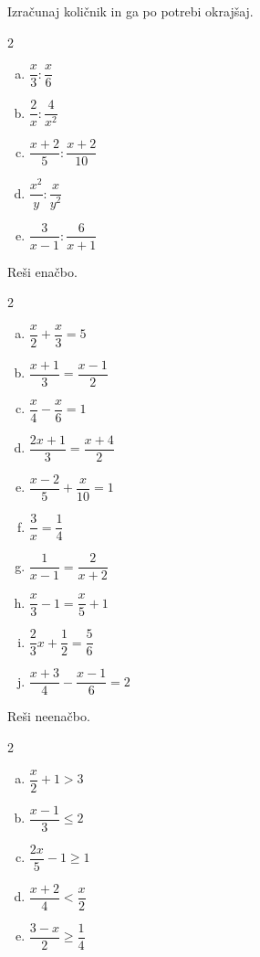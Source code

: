 \documentclass[a4paper,12pt]{letter}
\begin{document}
\begin{naloga}
Izra\v{c}unaj koli\v{c}nik in ga po potrebi okraj\v{s}aj.

\begin{multicols}{2}
\begin{enumerate}[a.)]
\item $\dfrac{x}{3}:\dfrac{x}{6}$
\item $\dfrac{2}{x}:\dfrac{4}{x^2}$
\item $\dfrac{x+2}{5}:\dfrac{x+2}{10}$
\item $\dfrac{x^2}{y}:\dfrac{x}{y^2}$
\item $\dfrac{3}{x-1}:\dfrac{6}{x+1}$
\end{enumerate}
\end{multicols}
\end{naloga}
\newpage

\begin{naloga}
Re\v{s}i ena\v{c}bo.

\begin{multicols}{2}
\begin{enumerate}[a.)]
\item $\dfrac{x}{2}+\dfrac{x}{3}=5$
\item $\dfrac{x+1}{3}=\dfrac{x-1}{2}$
\item $\dfrac{x}{4}-\dfrac{x}{6}=1$
\item $\dfrac{2x+1}{3}=\dfrac{x+4}{2}$
\item $\dfrac{x-2}{5}+\dfrac{x}{10}=1$
\item $\dfrac{3}{x}=\dfrac{1}{4}$
\item $\dfrac{1}{x-1}=\dfrac{2}{x+2}$
\item $\dfrac{x}{3}-1=\dfrac{x}{5}+1$
\item $\dfrac{2}{3}x+\dfrac{1}{2}=\dfrac{5}{6}$
\item $\dfrac{x+3}{4}-\dfrac{x-1}{6}=2$
\end{enumerate}
\end{multicols}
\end{naloga}

\begin{naloga}
Re\v{s}i neena\v{c}bo.

\begin{multicols}{2}
\begin{enumerate}[a.)]
\item $\dfrac{x}{2}+1>3$
\item $\dfrac{x-1}{3}\le2$
\item $\dfrac{2x}{5}-1\ge1$
\item $\dfrac{x+2}{4}<\dfrac{x}{2}$
\item $\dfrac{3-x}{2}\ge\dfrac{1}{4}$
\end{enumerate}
\end{multicols}
\end{naloga}
\end{document}
